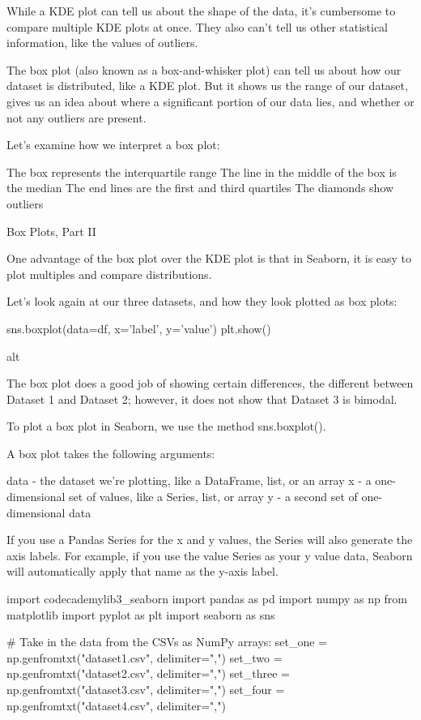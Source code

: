 \documentclass{journal}
\begin{document}
While a KDE plot can tell us about the shape of the data, it’s cumbersome to compare multiple KDE plots at once. They also can’t tell us other statistical information, like the values of outliers.

The box plot (also known as a box-and-whisker plot) can tell us about how our dataset is distributed, like a KDE plot. But it shows us the range of our dataset, gives us an idea about where a significant portion of our data lies, and whether or not any outliers are present.

Let’s examine how we interpret a box plot:

    The box represents the interquartile range
    The line in the middle of the box is the median
    The end lines are the first and third quartiles
    The diamonds show outliers



Box Plots, Part II

One advantage of the box plot over the KDE plot is that in Seaborn, it is easy to plot multiples and compare distributions.

Let’s look again at our three datasets, and how they look plotted as box plots:

sns.boxplot(data=df, x='label', y='value')
plt.show()

alt

The box plot does a good job of showing certain differences, the different between Dataset 1 and Dataset 2; however, it does not show that Dataset 3 is bimodal.

To plot a box plot in Seaborn, we use the method sns.boxplot().

A box plot takes the following arguments:

    data - the dataset we’re plotting, like a DataFrame, list, or an array
    x - a one-dimensional set of values, like a Series, list, or array
    y - a second set of one-dimensional data

If you use a Pandas Series for the x and y values, the Series will also generate the axis labels. For example, if you use the value Series as your y value data, Seaborn will automatically apply that name as the y-axis label.


import codecademylib3_seaborn
import pandas as pd
import numpy as np
from matplotlib import pyplot as plt
import seaborn as sns

# Take in the data from the CSVs as NumPy arrays:
set_one = np.genfromtxt("dataset1.csv", delimiter=",")
set_two = np.genfromtxt("dataset2.csv", delimiter=",")
set_three = np.genfromtxt("dataset3.csv", delimiter=",")
set_four = np.genfromtxt("dataset4.csv", delimiter=",")
\end{document}
